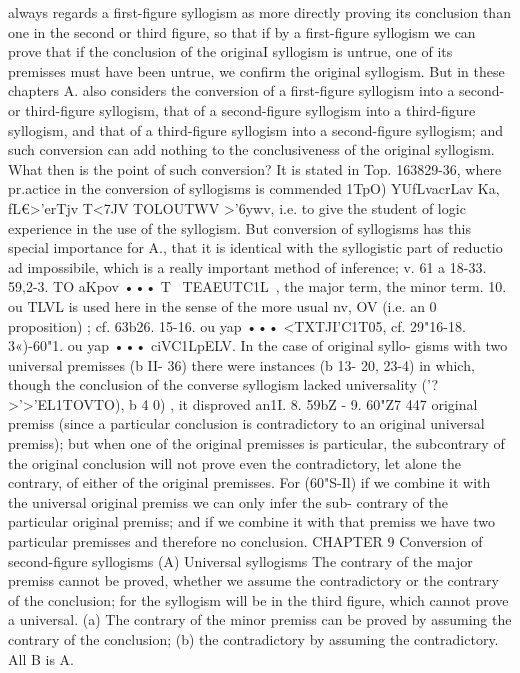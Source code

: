 {{{always regards a first-figure syllogism as more directly proving its
conclusion than one in the second or third figure, so that if by a
first-figure syllogism we can prove that if the conclusion of the
originaI syllogism is untrue, one of its premisses must have been
untrue, we confirm the original syllogism. But in these chapters
A. also considers the conversion of a first-figure syllogism into a
second- or third-figure syllogism, that of a second-figure syllogism
into a third-figure syllogism, and that of a third-figure syllogism
into a second-figure syllogism; and such conversion can add
nothing to the conclusiveness of the original syllogism. What then
is the point of such conversion? It is stated in Top. 163829-36,
where pr.actice in the conversion of syllogisms is commended 1TpO)
YUfLvacrLav Ka, fL€>'erTjv T<7JV TOLOUTWV >'6ywv, i.e. to give the student
of logic experience in the use of the syllogism. But conversion of
syllogisms has this special importance for A., that it is identical
with the syllogistic part of reductio ad impossibile, which is a really
important method of inference; v. 61 a 18-33.
59},2-3. TO aKpov ••• T~ TEAEUTC1L~, the major term, the minor
term.
10. ou TLVL is used here in the sense of the more usual nv, OV
(i.e. an 0 proposition) ; cf. 63b26.
15-16. ou yap ••• <TXTJI'C1T05, cf. 29"16-18.
3«)-60"1. ou yap ••• ciVC1LpELV. In the case of original syllo-
gisms with two universal premisses (b II- 36) there were instances
(b 13- 20, 23-4) in which, though the conclusion of the converse
syllogism lacked universality ('?>'>'EL1TOVTO), b 4 0) , it disproved an1I. 8. 59bZ - 9. 60"Z7
447
original premiss (since a particular conclusion is contradictory to
an original universal premiss); but when one of the original
premisses is particular, the subcontrary of the original conclusion
will not prove even the contradictory, let alone the contrary, of
either of the original premisses. For (60"S-Il) if we combine it
with the universal original premiss we can only infer the sub-
contrary of the particular original premiss; and if we combine it
with that premiss we have two particular premisses and therefore
no conclusion.
CHAPTER 9
Conversion of second-figure syllogisms
(A) Universal syllogisms
The contrary of the major premiss cannot be proved, whether
we assume the contradictory or the contrary of the conclusion;
for the syllogism will be in the third figure, which cannot prove a
universal. (a) The contrary of the minor premiss can be proved
by assuming the contrary of the conclusion; (b) the contradictory
by assuming the contradictory.
All B is A.
}}
